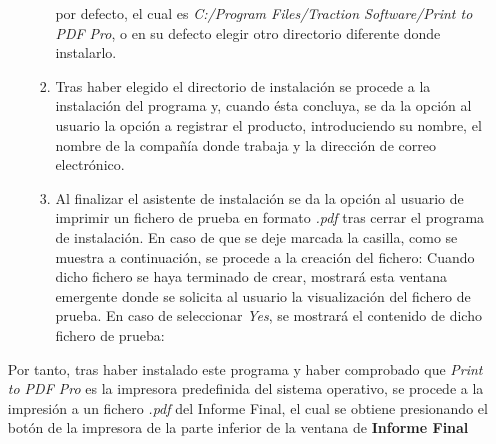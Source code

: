 \begin{itemize}
\begin{itemize}
\begin{enumerate}
                por defecto, el cual es \textit{C:/Program Files/Traction
                Software/Print to PDF Pro}, o en su defecto elegir otro
                directorio diferente donde instalarlo.
                \item Tras haber elegido el directorio de instalación se procede
                a la instalación del programa y, cuando ésta concluya, se da la
                opción al usuario la opción a registrar el producto,
                introduciendo su nombre, el nombre de la compañía donde trabaja
                y la dirección de correo electrónico.
                \item Al finalizar el asistente de instalación se da la opción
                al usuario de imprimir un fichero de prueba en formato
                \textit{.pdf} tras cerrar el programa de instalación. En caso de
                que se deje marcada la casilla, como se muestra a continuación,
                se procede a la creación del fichero:
                Cuando dicho fichero se haya terminado de crear, mostrará esta ventana emergente donde se solicita al usuario la visualización del fichero de prueba. En caso de seleccionar \textit{Yes}, se mostrará el contenido de dicho fichero de prueba:
            \end{enumerate} 
        \end{itemize}
        Por tanto, tras haber instalado este programa y haber comprobado que \textit{Print to PDF Pro} es la impresora predefinida del sistema operativo, se procede a la impresión a un fichero \textit{.pdf} del Informe Final, el cual se obtiene presionando el botón de la impresora de la parte inferior de la ventana de \textbf{Informe Final}
    \end{itemize}
